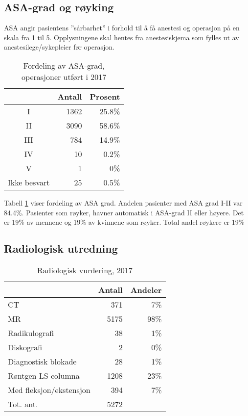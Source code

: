 \documentclass [norsk,a4paper,twoside]{article}\usepackage[]{graphicx}\usepackage[]{color}
\begin{document}
\clearpage



\subsection{ASA-grad og røyking}
ASA angir pasientens ”sårbarhet” i forhold til å få anestesi og operasjon på en skala fra 1 til 5. 
Opplysningene skal hentes fra anestesiskjema som fylles ut av anestesilege/sykepleier før operasjon.
\begin{table}[ht]
\centering
\begin{tabular}{crr}
  \hline
 & Antall & Prosent \\ 
  \hline
I & 1362 & 25.8\% \\ 
  II & 3090 & 58.6\% \\ 
  III & 784 & 14.9\% \\ 
  IV & 10 & 0.2\% \\ 
  V & 1 & 0\% \\ 
  Ikke besvart & 25 & 0.5\% \\ 
   \hline
\end{tabular}
\caption{Fordeling av ASA-grad, operasjoner utført i 2017} 
\label{tab:ASA}
\end{table}


Tabell \ref{tab:ASA} viser fordeling av ASA grad. Andelen pasienter med ASA grad I-II 
var 84.4\%. Pasienter som røyker, havner 
automatisk i ASA-grad II eller høyere. 
Det er 19\% av mennene og 19\% av kvinnene som røyker. 
                    Total andel røykere er 19\%



\subsection{Radiologisk utredning}

\begin{table}[ht]
\centering
\begin{tabular}{lrr}
  \hline
 & Antall & Andeler \\ 
  \hline
CT & 371 & 7\% \\ 
  MR & 5175 & 98\% \\ 
  Radikulografi & 38 & 1\% \\ 
  Diskografi & 2 & 0\% \\ 
  Diagnostisk blokade & 28 & 1\% \\ 
  Røntgen LS-columna & 1208 & 23\% \\ 
  Med fleksjon/ekstensjon & 394 & 7\% \\ 
  Tot. ant. & 5272 &   \\ 
   \hline
\end{tabular}
\caption{Radiologisk vurdering, 2017} 
\label{tab:RV}
\end{table}
\end{document}
